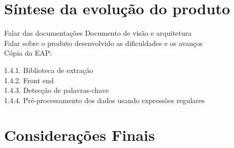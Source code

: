 \documentclass[12pt]{article}
\begin{document}
\section{Síntese da evolução do produto}
\label{sec:sintese}

Falar das documentações Documento de visão e arquitetura\\
Falar sobre o produto desenvolvido as dificuldades e os avanços\\

Cópia da EAP:

1.4.1. Biblioteca de extração\\
1.4.2. Front end\\
1.4.3. Detecção de palavras-chave\\
1.4.4. Pré-processamento dos dados usando expressões regulares\\

\section{Considerações Finais}
\label{sec:consideracoes}




\end{document}
